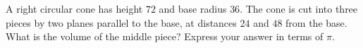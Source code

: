 A right circular cone has height $72$ and base radius $36$. The cone is cut into three pieces by two planes parallel to the base, at distances $24$ and $48$ from the base. What is the volume of the middle piece? Express your answer in terms of $\pi$.

